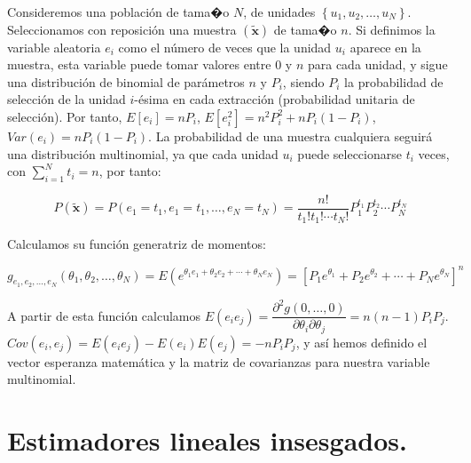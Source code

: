 Consideremos una poblaci\'on de tama�o $N$, de unidades $\left\{ u_{1},u_{2},\ldots,u_{N}\right\} $.
Seleccionamos con reposici\'on una muestra $\left(\widetilde{\boldsymbol{x}}\right)$
de tama�o $n$. Si definimos la variable aleatoria $e_{i}$ como el
n\'umero de veces que la unidad $u_{i}$ aparece en la muestra, esta
variable puede tomar valores entre $0$ y $n$ para cada unidad, y
sigue una distribuci\'on de binomial de par\'ametros $n$ y $P_{i}$,
siendo $P_{i}$ la probabilidad de selecci\'on de la unidad $i$-\'esima
en cada extracci\'on (probabilidad unitaria de selecci\'on). Por tanto,
$E\left[e_{i}\right]=nP_{i}$, $E\left[e_{i}^{2}\right]=n^{2}P_{i}^{2}+nP_{i}\left(1-P_{i}\right)$,
$Var\left(e_{i}\right)=nP_{i}\left(1-P_{i}\right)$. La probabilidad
de una muestra cualquiera seguir\'a una distribuci\'on multinomial, ya
que cada unidad $u_{i}$ puede seleccionarse $t_{i}$ veces, con $\sum_{i=1}^{N}t_{i}=n$,
por tanto:

\[
P\left(\widetilde{\boldsymbol{x}}\right)=P\left(e_{1}=t_{1},e_{1}=t_{1},\ldots,e_{N}=t_{N}\right)=\dfrac{n!}{t_{1}!t_{1}!\cdots t_{N}!}P_{1}^{t_{1}}P_{2}^{t_{2}}\cdots P_{N}^{t_{N}}
\]


Calculamos su funci\'on generatriz de momentos:

\[
g_{e_{1},e_{2},\ldots,e_{N}}\left(\theta_{1},\theta_{2},\ldots,\theta_{N}\right)=E\left(e^{\theta_{1}e_{1}+\theta_{2}e_{2}+\cdots+\theta_{N}e_{N}}\right)=\left[P_{1}e^{\theta_{1}}+P_{2}e^{\theta_{2}}+\cdots+P_{N}e^{\theta_{N}}\right]^{n}
\]


A partir de esta funci\'on calculamos $E\left(e_{i}e_{j}\right)=\dfrac{\partial^{2}g\left(0,\ldots,0\right)}{\partial\theta_{i}\partial\theta_{j}}=n\left(n-1\right)P_{i}P_{j}$.
$Cov\left(e_{i},e_{j}\right)=E\left(e_{i}e_{j}\right)-E\left(e_{i}\right)E\left(e_{j}\right)=-nP_{i}P_{j}$,
y as\'i hemos definido el vector esperanza matem\'atica y la matriz de
covarianzas para nuestra variable multinomial.


\section{Estimadores lineales insesgados.}

